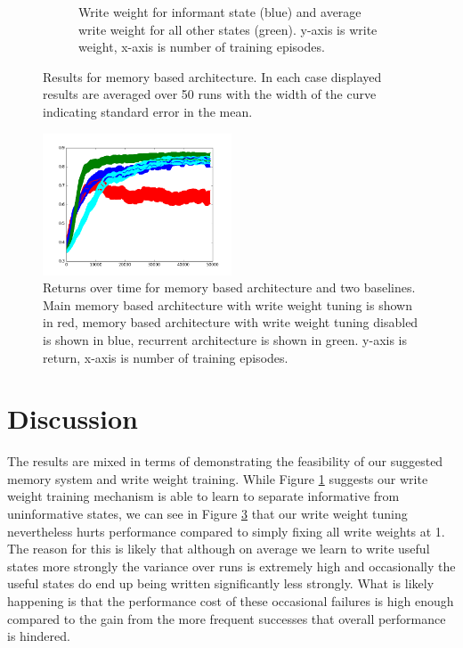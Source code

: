\documentclass{article}
\begin{document}
\begin{figure}[!ht]
\begin{subfigure}[t]{.45\textwidth}
  \caption{Write weight for informant state (blue) and average write weight for all other states (green). y-axis is write weight, x-axis is number of training episodes.}
  \label{fig:1_query_write}
\end{subfigure}
\caption{Results for memory based architecture. In each case displayed results are averaged over 50 runs with the width of the curve indicating standard error in the mean.}
\label{fig:1_query}
\end{figure}

\begin{figure}[!ht]
\center
\includegraphics[width=0.5\textwidth]{images/combined_ret.png}
\caption{Returns over time for memory based architecture and two baselines. Main memory based architecture with write weight tuning is shown in red, memory based architecture with write weight tuning disabled is shown in blue, recurrent architecture is shown in green. y-axis is return, x-axis is number of training episodes.}
\label{fig:comparison}
\end{figure}

\section*{Discussion}
The results are mixed in terms of demonstrating the feasibility of our suggested memory system and write weight training. While Figure \ref{fig:1_query_write} suggests our write weight training mechanism is able to learn to separate informative from uninformative states, we can see in Figure \ref{fig:comparison} that our write weight tuning nevertheless hurts performance compared to simply fixing all write weights at 1. The reason for this is likely that although on average we learn to write useful states more strongly the variance over runs is extremely high and occasionally the useful states do end up being written significantly less strongly. What is likely happening is that the performance cost of these occasional failures is high enough compared to the gain from the more frequent successes that overall performance is hindered. 
\end{document}
